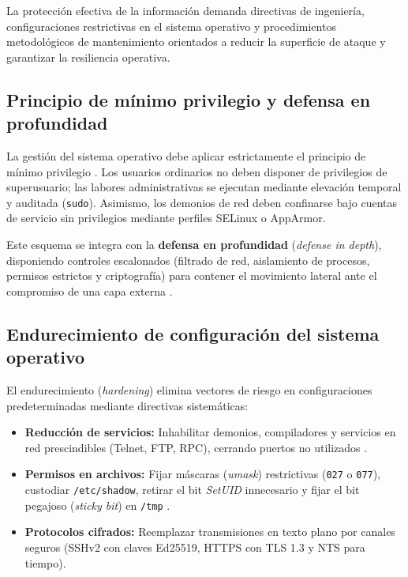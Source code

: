 \documentclass[12pt]{article}
\begin{document}
La protección efectiva de la información demanda directivas de ingeniería, configuraciones restrictivas en el sistema operativo y procedimientos metodológicos de mantenimiento orientados a reducir la superficie de ataque y garantizar la resiliencia operativa.

\subsection{Principio de mínimo privilegio y defensa en profundidad}\label{subsec:minimoPrivilegioDefensaProfundidad}

La gestión del sistema operativo debe aplicar estrictamente el principio de mínimo privilegio \parencite[\S 14.2, p.\ 484]{silberschatz2006fundamentos}. Los usuarios ordinarios no deben disponer de privilegios de superusuario; las labores administrativas se ejecutan mediante elevación temporal y auditada (\texttt{sudo}). Asimismo, los demonios de red deben confinarse bajo cuentas de servicio sin privilegios mediante perfiles SELinux o AppArmor.

Este esquema se integra con la \textbf{defensa en profundidad} (\textit{defense in depth}), disponiendo controles escalonados (filtrado de red, aislamiento de procesos, permisos estrictos y criptografía) para contener el movimiento lateral ante el compromiso de una capa externa \parencite[\S 19.6, p.\ 939]{deitel2004operating}.

\subsection{Endurecimiento de configuración del sistema operativo}\label{subsec:endurecimientoConfiguracionSo}

El endurecimiento (\textit{hardening}) elimina vectores de riesgo en configuraciones predeterminadas \parencite[\S 15.5, p.\ 681]{stallings2018operating} mediante directivas sistemáticas:
\begin{itemize}[noitemsep, topsep=2pt]
    \item \textbf{Reducción de servicios:} Inhabilitar demonios, compiladores y servicios en red prescindibles (Telnet, FTP, RPC), cerrando puertos no utilizados \parencite[\S 15.5, p.\ 683]{stallings2018operating}.
    \item \textbf{Permisos en archivos:} Fijar máscaras (\textit{umask}) restrictivas (\texttt{027} o \texttt{077}), custodiar \texttt{/etc/shadow}, retirar el bit \textit{SetUID} innecesario y fijar el bit pegajoso (\textit{sticky bit}) en \texttt{/tmp} \parencite[\S 15.5, p.\ 681]{stallings2018operating}.
    \item \textbf{Protocolos cifrados:} Reemplazar transmisiones en texto plano por canales seguros (SSHv2 con claves Ed25519, HTTPS con TLS 1.3 y NTS para tiempo).
\end{itemize}
\end{document}
